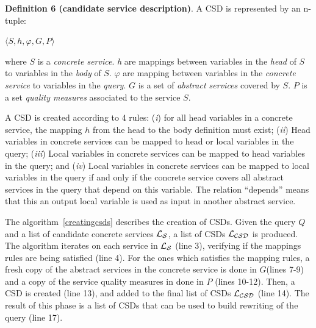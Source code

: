 \noindent \textbf{Definition 6 (candidate service description)}.
A CSD is represented by an n-tuple:
\begin{center}
$\langle S, h, \varphi, G, P\rangle$
\end{center}
where $S$ is a \textit{concrete service}. 
\textit{h} are mappings between variables in the \textit{head} of $S$ to variables in the \textit{body} of $S$. 
$\varphi$ are mapping between variables in the \textit{concrete service} to variables in the \textit{query}.
$G$ is a set of \textit{abstract services} covered by $S$. 
$P$ is a set \textit{quality measures} associated to the service $S$. 
 
A CSD is created according to 4 rules: (\textit{i}) for all head variables in a
concrete service, the mapping $h$ from the head to the body definition must
exist; (\textit{ii}) Head variables in concrete services can be mapped to head
or local variables in the query; (\textit{iii}) Local variables in concrete
services can be mapped to head variables in the query; and (\textit{iv}) Local
variables in concrete services can be mapped to local variables in the query if and only if the concrete service covers all abstract services in the query that depend on this variable. The relation ``depends''  means that this an output local variable is used as input in another abstract service.

The algorithm~\ref{creatingcsds} describes the creation of CSDs. Given the query $Q$ and a list of candidate concrete services $\hbox{${\cal L_{S}}$}$, a list of CSDs $\hbox{${\cal L_{CSD}}$}$ is produced. 
The algorithm iterates on each service in $\hbox{${\cal L_{S}}$}$ (line 3), verifying if the mappings rules are being satisfied (line 4). For the ones which satisfies the mapping rules, a fresh copy of the abstract services in the concrete service is done in $G$(lines 7-9) and a copy of the service quality measures in done in $P$ (lines 10-12). Then,
a CSD is created (line 13), and added to the final list of CSDs $\hbox{${\cal L_{CSD}}$}$ (line 14).
The result of this phase is a list of CSDs that can be used to build rewriting of the query (line 17).

